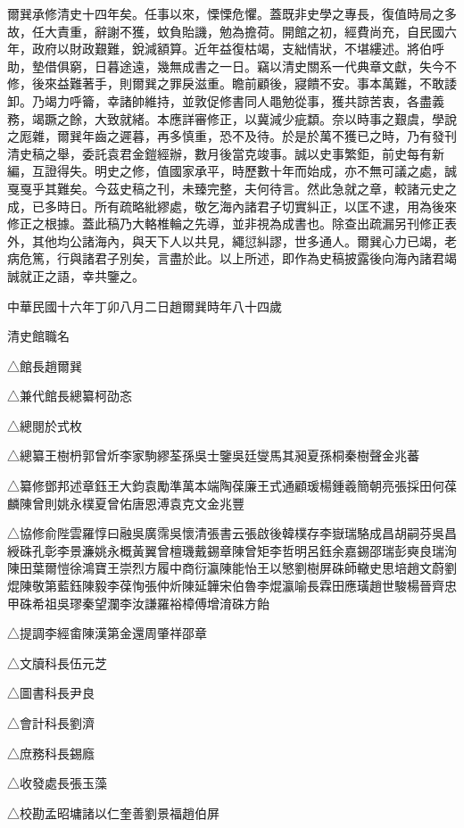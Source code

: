 
\begin{pinyinscope}
爾巽承修清史十四年矣。任事以來，慄慄危懼。蓋既非史學之專長，復值時局之多故，任大責重，辭謝不獲，蚊負貽譏，勉為擔荷。開館之初，經費尚充，自民國六年，政府以財政艱難，銳減額算。近年益復枯竭，支絀情狀，不堪縷述。將伯呼助，墊借俱窮，日暮途遠，幾無成書之一日。竊以清史關系一代典章文獻，失今不修，後來益難著手，則爾巽之罪戾滋重。瞻前顧後，寢饋不安。事本萬難，不敢諉卸。乃竭力呼籥，幸諸帥維持，並敦促修書同人黽勉從事，獲共諒苦衷，各盡義務，竭蹶之餘，大致就緒。本應詳審修正，以冀減少疵纇。奈以時事之艱虞，學說之厖雜，爾巽年齒之遲暮，再多慎重，恐不及待。於是於萬不獲已之時，乃有發刊清史稿之舉，委託袁君金鎧經辦，數月後當克竣事。誠以史事繁鉅，前史每有新編，互證得失。明史之修，值國家承平，時歷數十年而始成，亦不無可議之處，誠戛戛乎其難矣。今茲史稿之刊，未臻完整，夫何待言。然此急就之章，較諸元史之成，已多時日。所有疏略紕繆處，敬乞海內諸君子切實糾正，以匡不逮，用為後來修正之根據。蓋此稿乃大輅椎輪之先導，並非視為成書也。除查出疏漏另刊修正表外，其他均公諸海內，與天下人以共見，繩愆糾謬，世多通人。爾巽心力已竭，老病危篤，行與諸君子別矣，言盡於此。以上所述，即作為史稿披露後向海內諸君竭誠就正之語，幸共鑒之。

中華民國十六年丁卯八月二日趙爾巽時年八十四歲

清史館職名

△館長趙爾巽

△兼代館長總纂柯劭忞

△總閱於式枚

△總纂王樹枬郭曾炘李家駒繆荃孫吳士鑒吳廷燮馬其昶夏孫桐秦樹聲金兆蕃

△纂修鄧邦述章鈺王大鈞袁勵準萬本端陶葆廉王式通顧瑗楊鍾羲簡朝亮張採田何葆麟陳曾則姚永樸夏曾佑唐恩溥袁克文金兆豐

△協修俞陛雲羅惇曰融吳廣霈吳懷清張書云張啟後韓樸存李嶽瑞駱成昌胡嗣芬吳昌綬硃孔彰李景濂姚永概黃翼曾檀璣戴錫章陳曾矩李哲明呂鈺余嘉錫邵瑞彭奭良瑞洵陳田葉爾愷徐鴻寶王崇烈方履中商衍瀛陳能怡王以慜劉樹屏硃師轍史思培趙文蔚劉焜陳敬第藍鈺陳毅李葆恂張仲炘陳延韡宋伯魯李焜瀛喻長霖田應璜趙世駿楊晉齊忠甲硃希祖吳璆秦望瀾李汝謙羅裕樟傅增淯硃方飴

△提調李經畬陳漢第金還周肇祥邵章

△文牘科長伍元芝

△圖書科長尹良

△會計科長劉濟

△庶務科長錫廕

△收發處長張玉藻

△校勘孟昭墉諸以仁奎善劉景福趙伯屏


\end{pinyinscope}
